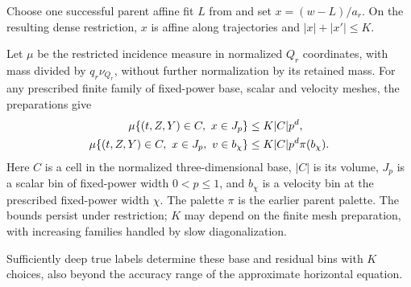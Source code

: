 \begin{lemma}
\label{lem:horizontal-affine}
Choose one successful parent affine fit \(L\) from
 and set
\(x=(w-L)/a_r\).  On the resulting dense restriction, \(x\) is
affine along trajectories and \(|x|+|x'|\le K\).

Let \(\mu\) be the restricted incidence measure in normalized
\(Q_r\) coordinates, with mass divided by \(q_r\nu_{Q_r}\), without
further normalization by its retained mass.  For any prescribed
finite family of fixed-power base, scalar and velocity meshes,
the preparations give
\begin{align}
 \mu\{(t,Z,Y)\in C,\ x\in J_p\}
     &\le K|C|p^d,\notag\\
 \mu\{(t,Z,Y)\in C,\ x\in J_p,\ v\in b_\chi\}
     &\le K|C|p^d\pi(b_\chi).
 \label{a06:residual-caps}
\end{align}
Here \(C\) is a cell in the normalized three-dimensional base,
\(|C|\) is its volume, \(J_p\) is a scalar bin of fixed-power
width \(0<p\le1\), and \(b_\chi\) is a velocity bin at the
prescribed fixed-power width \(\chi\).  The palette \(\pi\) is
the earlier parent palette.  The bounds persist under restriction;
\(K\) may depend on the finite mesh preparation, with increasing
families handled by slow diagonalization.

Sufficiently deep true labels determine these base and residual
bins with \(K\) choices, also beyond the accuracy range of the
approximate horizontal equation.
\end{lemma}
